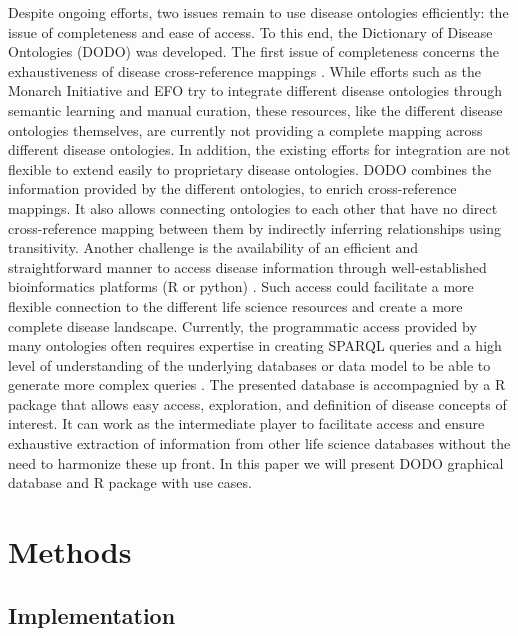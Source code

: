 \documentclass[9pt,a4paper,]{extarticle}
\begin{document}
Despite ongoing efforts, two issues remain to use disease ontologies efficiently: the issue of completeness and ease of access. To this end, the Dictionary of Disease Ontologies (DODO) was developed. The first issue of completeness concerns the exhaustiveness of disease cross-reference mappings \citep{Hu2017, Rappaport2013}. While efforts such as the Monarch Initiative and EFO try to integrate different disease ontologies through semantic learning and manual curation, these resources, like the different disease ontologies themselves, are currently not providing a complete mapping across different disease ontologies. In addition, the existing efforts for integration are not flexible to extend easily to proprietary disease ontologies. DODO combines the information provided by the different ontologies, to enrich cross-reference mappings. It also allows connecting ontologies to each other that have no direct cross-reference mapping between them by indirectly inferring relationships using transitivity. Another challenge is the availability of an efficient and straightforward manner to access disease information through well-established bioinformatics platforms (R or python) \citep{Rappaport2013, Saqi2018}. Such access could facilitate a more flexible connection to the different life science resources and create a more complete disease landscape. Currently, the programmatic access provided by many ontologies often requires expertise in creating SPARQL queries and a high level of understanding of the underlying databases or data model to be able to generate more complex queries \citep{Hasnain2014, Hu2017, Rappaport2013}. The presented database is accompagnied by a R package that allows easy access, exploration, and definition of disease concepts of interest. It can work as the intermediate player to facilitate access and ensure exhaustive extraction of information from other life science databases without the need to harmonize these up front. In this paper we will present DODO graphical database and R package with use cases.

\hypertarget{methods}{%
\section{Methods}\label{methods}}

\hypertarget{implementation}{%
\subsection{Implementation}\label{implementation}}
\end{document}

